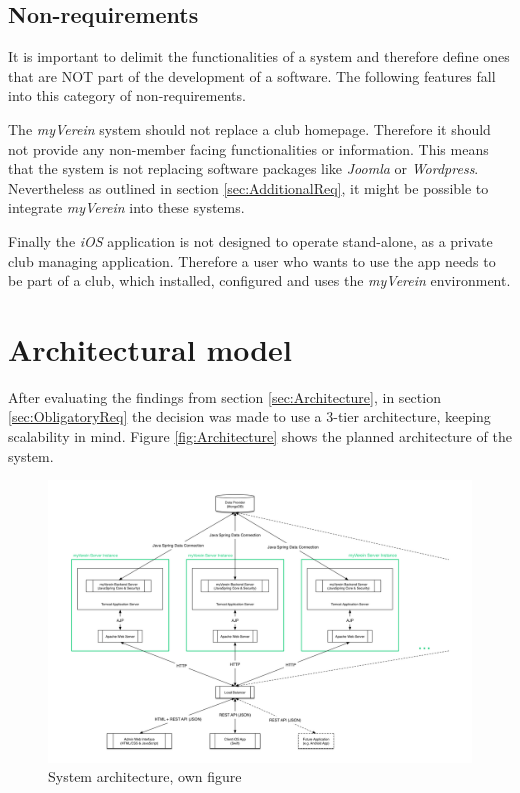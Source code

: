 \subsection{Non-requirements} %

It is important to delimit the functionalities of a system and therefore define ones that are NOT part of the development of a software. The following features fall into this category of non-requirements.

The \emph{myVerein} system should not replace a club homepage. Therefore it should not provide any non-member facing functionalities or information. This means that the system is not replacing software packages like \emph{Joomla} or \emph{Wordpress}. Nevertheless as outlined in section \vref{sec:AdditionalReq}, it might be possible to integrate \emph{myVerein} into these systems.

Finally the \emph{iOS} application is not designed to operate stand-alone, as a private club managing application. Therefore a user who wants to use the app needs to be part of a club, which installed, configured and uses the \emph{myVerein} environment.

\section{Architectural model}
\label{sec:ArchitecturalModel}
After evaluating the findings from section \vref{sec:Architecture}, in section \vref{sec:ObligatoryReq} the decision was made to use a 3-tier architecture, keeping scalability in mind. Figure \vref{fig:Architecture} shows the planned architecture of the system. 

\begin{figure}[h]
  	\centering
  	\includegraphics[width=0.95\linewidth]{./images/architecture.png}
  	\caption{System architecture, own figure}
	\label{fig:Architecture}
\end{figure}

